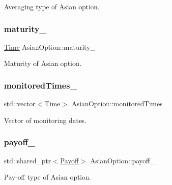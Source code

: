 Averaging type of Asian option. 

\hypertarget{class_asian_option_aff2f0be31b55a1b859cde9ee9b339075}{}\label{class_asian_option_aff2f0be31b55a1b859cde9ee9b339075} 
\subsubsection{\texorpdfstring{maturity\+\_\+}{maturity\_}}
{\footnotesize\ttfamily \hyperlink{_name_def_8h_ac2d3e0ba793497bcca555c7c2cf64ff3}{Time} Asian\+Option\+::maturity\+\_\+\hspace{0.3cm}{\ttfamily [private]}}



Maturity of Asian option. 

\hypertarget{class_asian_option_a8cc25f4cabd8ceac95a69598481f18c8}{}\label{class_asian_option_a8cc25f4cabd8ceac95a69598481f18c8} 
\subsubsection{\texorpdfstring{monitored\+Times\+\_\+}{monitoredTimes\_}}
{\footnotesize\ttfamily std\+::vector$<$\hyperlink{_name_def_8h_ac2d3e0ba793497bcca555c7c2cf64ff3}{Time}$>$ Asian\+Option\+::monitored\+Times\+\_\+\hspace{0.3cm}{\ttfamily [private]}}



Vector of monitoring dates. 

\hypertarget{class_asian_option_abb0ef9b7f812435dcf24e4dd8edb2be2}{}\label{class_asian_option_abb0ef9b7f812435dcf24e4dd8edb2be2} 
\subsubsection{\texorpdfstring{payoff\+\_\+}{payoff\_}}
{\footnotesize\ttfamily std\+::shared\+\_\+ptr$<$\hyperlink{class_payoff}{Payoff}$>$ Asian\+Option\+::payoff\+\_\+\hspace{0.3cm}{\ttfamily [private]}}



Pay-\/off type of Asian option. 

